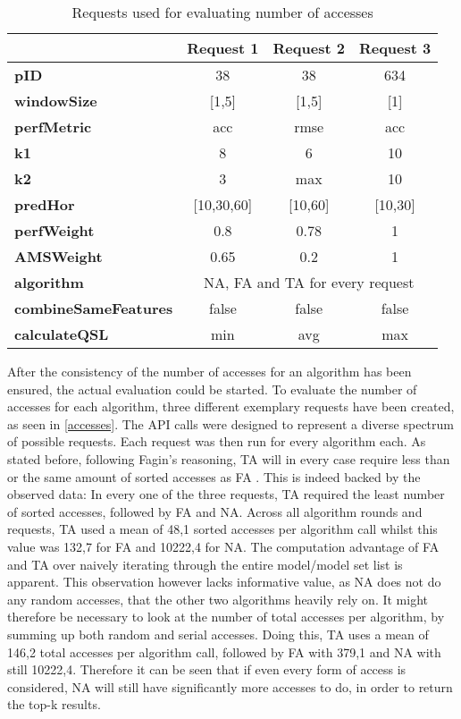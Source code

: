 \begin{table}[h]
\centering
    \begin{tabular}{ l | c  c  c }
        \toprule
        &
\textbf{Request 1}      
& \textbf{Request 2}   
& \textbf{Request 3} \\\midrule

\textbf{pID} & 38 & 38 & 634 \\\midrule
\textbf{windowSize} & [1,5] & [1,5] & [1] \\\midrule
\textbf{perfMetric} & acc & rmse & acc \\\midrule
\textbf{k1} & 8 & 6 &10 \\\midrule
\textbf{k2} & 3 & max & 10 \\\midrule
\textbf{predHor} & [10,30,60] & [10,60] & [10,30]\\\midrule
\textbf{perfWeight} & 0.8 & 0.78 & 1 \\\midrule
\textbf{AMSWeight} & 0.65 & 0.2 & 1\\\midrule
\textbf{algorithm}  & \multicolumn{3}{c}{NA, FA and TA for every request}  \\\midrule
\textbf{combineSameFeatures} & false & false & false \\\midrule
\textbf{calculateQSL} & min & avg & max\\
        \bottomrule
    \end{tabular}
\caption{Requests used for evaluating number of accesses} \label{accesses}
\end{table}

After the consistency of the number of accesses for an algorithm has been ensured, the actual evaluation could be started. To evaluate the number of accesses for each algorithm, three different exemplary requests have been created, as seen in \autoref{accesses}. The API calls were designed to represent a diverse spectrum of possible requests. Each request was then run for every algorithm each. As stated before, following Fagin’s reasoning, TA will in every case require less than or the same amount of sorted accesses as FA \cite{fagin2002}. This is indeed backed by the observed data: In every one of the three requests, TA required the least number of sorted accesses, followed by FA and NA. Across all algorithm rounds and requests, TA used a mean of 48,1 sorted accesses per algorithm call whilst this value was 132,7 for FA and 10222,4 for NA. The computation advantage of FA and TA over naively iterating through the entire model/model set list is apparent. This observation however lacks informative value, as NA does not do any random accesses, that the other two algorithms heavily rely on. It might therefore be necessary to look at the number of total accesses per algorithm, by summing up both random and serial accesses. Doing this, TA uses a mean of 146,2 total accesses per algorithm call, followed by FA with 379,1 and NA with still 10222,4. Therefore it can be seen that if even every form of access is considered, NA will still have significantly more accesses to do, in order to return the top-k results. 

